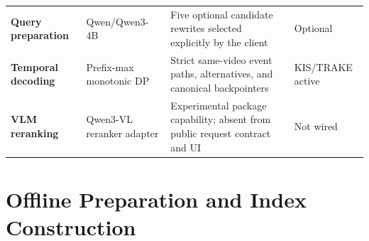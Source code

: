 \begin{table}[htbp]
\begin{tabularx}{\textwidth}{@{}>{\bfseries}p{}p{}Xp{}@{}}
Query preparation & Qwen/Qwen3-4B & Five optional candidate rewrites selected explicitly by the client & Optional \\
Temporal decoding & Prefix-max monotonic DP & Strict same-video event paths, alternatives, and canonical backpointers & KIS/TRAKE active \\
VLM reranking & Qwen3-VL reranker adapter & Experimental package capability; absent from public request contract and UI & Not wired \\
\bottomrule
\end{tabularx}
\end{table}

\clearpage
\section{Offline Preparation and Index Construction}

